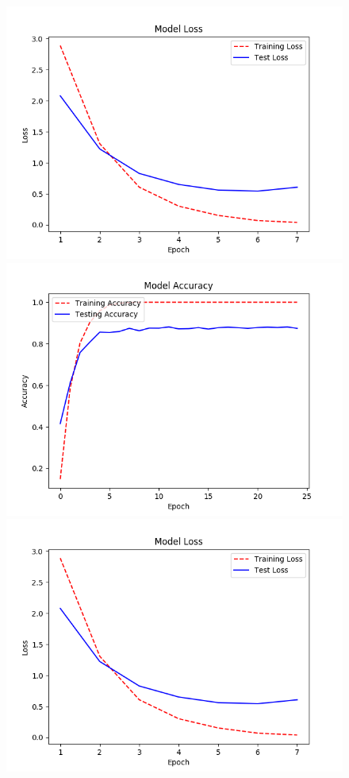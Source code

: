 \documentclass[11pt]{article}
\begin{document}
\begin{figure}[H]
\begin{center}
    \includegraphics[scale=0.5]{images/NewModelLoss7Epochs.png}
    \includegraphics[scale = 0.5]{images/NewModelAccuracy25Epochs.png}
    \includegraphics[scale=0.5]{images/NewModelLoss7Epochs.png}

\end{center}
\end{figure}
\end{document}
